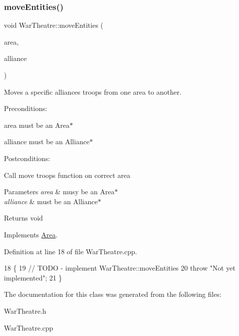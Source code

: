 \subsubsection{\texorpdfstring{move\+Entities()}{moveEntities()}}
{\footnotesize\ttfamily void War\+Theatre\+::move\+Entities (\begin{DoxyParamCaption}\item[{\hyperlink{classArea}{Area} $\ast$}]{area,  }\item[{\hyperlink{classAlliance}{Alliance} $\ast$}]{alliance }\end{DoxyParamCaption})\hspace{0.3cm}{\ttfamily [virtual]}}



Moves a specific alliances troops from one area to another. 

Preconditions\+:
\begin{DoxyItemize}
\item area must be an Area$\ast$
\end{DoxyItemize}

alliance must be an Alliance$\ast$

Postconditions\+:
\begin{DoxyItemize}
\item Call move troops function on correct area
\end{DoxyItemize}


\begin{DoxyParams}{Parameters}
{\em area} & musy be an Area$\ast$ \\
\hline
{\em alliance} & must be an Alliance$\ast$ \\
\hline
\end{DoxyParams}
\begin{DoxyReturn}{Returns}
void 
\end{DoxyReturn}


Implements \hyperlink{classArea}{Area}.



Definition at line 18 of file War\+Theatre.\+cpp.


\begin{DoxyCode}
18                                                             \{
19     \textcolor{comment}{// TODO - implement WarTheatre::moveEntities}
20     \textcolor{keywordflow}{throw} \textcolor{stringliteral}{"Not yet implemented"};
21 \}
\end{DoxyCode}


The documentation for this class was generated from the following files\+:\begin{DoxyCompactItemize}
\item 
War\+Theatre.\+h\item 
War\+Theatre.\+cpp\end{DoxyCompactItemize}
